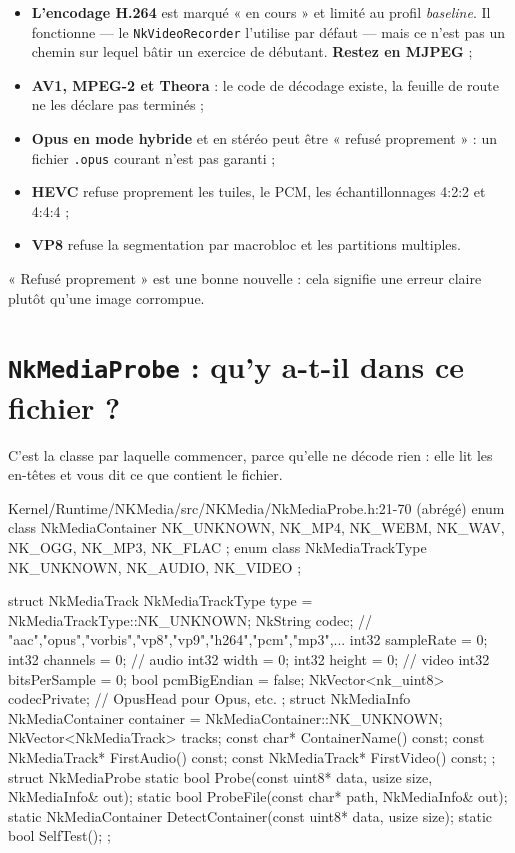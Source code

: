 \begin{nkpiege}
\begin{itemize}
  \item \textbf{L'encodage H.264} est marqué « en cours » et limité au profil
        \emph{baseline}. Il fonctionne — le \texttt{NkVideoRecorder} l'utilise
        par défaut — mais ce n'est pas un chemin sur lequel bâtir un exercice de
        débutant. \textbf{Restez en MJPEG} ;
  \item \textbf{AV1, MPEG-2 et Theora} : le code de décodage existe, la feuille
        de route ne les déclare pas terminés ;
  \item \textbf{Opus en mode hybride} et en stéréo peut être « refusé
        proprement » : un fichier \texttt{.opus} courant n'est pas garanti ;
  \item \textbf{HEVC} refuse proprement les tuiles, le PCM, les
        échantillonnages 4:2:2 et 4:4:4 ;
  \item \textbf{VP8} refuse la segmentation par macrobloc et les partitions
        multiples.
\end{itemize}
« Refusé proprement » est une bonne nouvelle : cela signifie une erreur claire
plutôt qu'une image corrompue.
\end{nkpiege}

\section{\texttt{NkMediaProbe} : qu'y a-t-il dans ce fichier ?}

C'est la classe par laquelle commencer, parce qu'elle ne décode rien : elle lit
les en-têtes et vous dit ce que contient le fichier.

\begin{nkcode}{Kernel/Runtime/NKMedia/src/NKMedia/NkMediaProbe.h:21-70 (abrégé)}
enum class NkMediaContainer { NK_UNKNOWN, NK_MP4, NK_WEBM, NK_WAV, NK_OGG, NK_MP3, NK_FLAC };
enum class NkMediaTrackType { NK_UNKNOWN, NK_AUDIO, NK_VIDEO };

struct NkMediaTrack {
        NkMediaTrackType type = NkMediaTrackType::NK_UNKNOWN;
        NkString codec;          // "aac","opus","vorbis","vp8","vp9","h264","pcm","mp3",...
        int32 sampleRate = 0;    int32 channels = 0;      // audio
        int32 width = 0;         int32 height = 0;        // video
        int32 bitsPerSample = 0; bool pcmBigEndian = false;
        NkVector<nk_uint8> codecPrivate;                  // OpusHead pour Opus, etc.
};
struct NkMediaInfo {
        NkMediaContainer container = NkMediaContainer::NK_UNKNOWN;
        NkVector<NkMediaTrack> tracks;
        const char* ContainerName() const;
        const NkMediaTrack* FirstAudio() const;
        const NkMediaTrack* FirstVideo() const;
};
struct NkMediaProbe {
        static bool Probe(const uint8* data, usize size, NkMediaInfo& out);
        static bool ProbeFile(const char* path, NkMediaInfo& out);
        static NkMediaContainer DetectContainer(const uint8* data, usize size);
        static bool SelfTest();
};
\end{nkcode}

